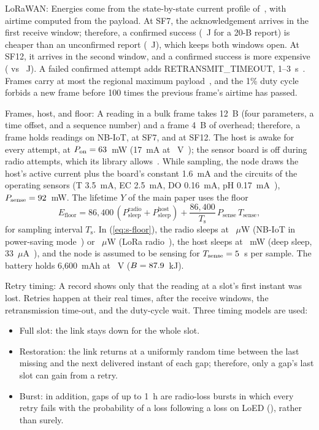 \documentclass[journal]{IEEEtran}
\begin{document}
LoRaWAN: Energies come from the state-by-state current profile of~\cite{casals2017lorawan}, with airtime computed from the payload. At SF7, the acknowledgement arrives in the first receive window; therefore, a confirmed success (\eSfSevenConf~J for a 20-B report) is cheaper than an unconfirmed report (\eSfSevenUnconf~J), which keeps both windows open. At SF12, it arrives in the second window, and a confirmed success is more expensive (\eSfTwelveConf{} vs \eSfTwelveUnconf~J). A failed confirmed attempt adds RETRANSMIT\_TIMEOUT, 1--3~s~\cite{lora2021rp002}. Frames carry at most the regional maximum payload~\cite{lora2021rp002}, and the 1\% duty cycle forbids a new frame before 100 times the previous frame's airtime has passed.

Frames, host, and floor: A reading in a bulk frame takes 12~B (four parameters, a time offset, and a sequence number) and a frame 4~B of overhead; therefore, a frame holds \rpfNb{} readings on NB-IoT, \rpfSfSeven{} at SF7, and \rpfSfTwelve{} at SF12. The host is awake for every attempt, at $P_\mathrm{on}=63$~mW (17~mA at \vNode~V~\cite{libeliumwaspmote}); the sensor board is off during radio attempts, which its library allows~\cite{libeliumsmartwater}. While sampling, the node draws the host's active current plus the board's constant 1.6~mA and the circuits of the operating sensors (T 3.5~mA, EC 2.5~mA, DO 0.16~mA, pH 0.17~mA~\cite{libeliumsmartwater}), $P_\mathrm{sense}=92$~mW. The lifetime $Y$ of the main paper uses the floor
\begin{equation}
E_\mathrm{floor}=86{,}400\,(P_\mathrm{sleep}^\mathrm{radio}+P_\mathrm{sleep}^\mathrm{host})+\frac{86{,}400}{T_\mathrm{s}}\,P_\mathrm{sense}\,T_\mathrm{sense},\label{eq:s-floor}
\end{equation}
for sampling interval $T_\mathrm{s}$. In (\ref{eq:s-floor}), the radio sleeps at \nbPsmUW~$\mu$W (NB-IoT in power-saving mode~\cite{michelinakis2021dissecting}) or \loraSleepUW~$\mu$W (LoRa radio~\cite{casals2017lorawan}), the host sleeps at \hostSleepMW~mW (deep sleep, 33~$\mu$A~\cite{libeliumwaspmote}), and the node is assumed to be sensing for $T_\mathrm{sense}=5$~s per sample. The battery holds 6{,}600~mAh at \vNode~V ($B=87.9$~kJ).

Retry timing: A record shows only that the reading at a slot's first instant was lost. Retries happen at their real times, after the receive windows, the retransmission time-out, and the duty-cycle wait. Three timing models are used:
\begin{itemize}
\item Full slot: the link stays down for the whole slot.
\item Restoration: the link returns at a uniformly random time between the last missing and the next delivered instant of each gap; therefore, only a gap's last slot can gain from a retry.
\item Burst: in addition, gaps of up to 1~h are radio-loss bursts in which every retry fails with the probability of a loss following a loss on LoED (\loedCondLoss), rather than surely.
\end{itemize}
\end{document}
